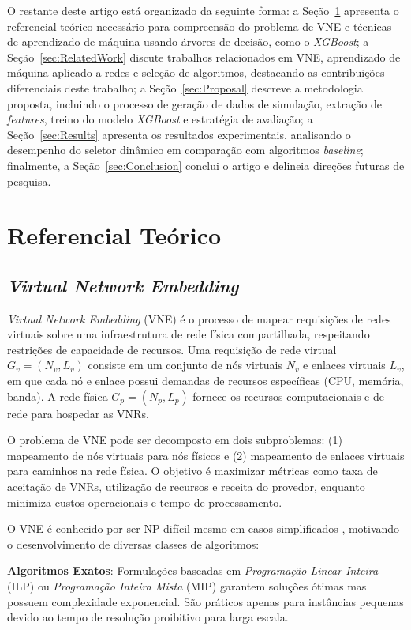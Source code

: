 \documentclass[conference]{IEEEtran}
\begin{document}
O restante deste artigo está organizado da seguinte forma: a Seção~\ref{sec:RefTeo} apresenta o referencial teórico necessário para compreensão do problema de VNE e técnicas de aprendizado de máquina usando árvores de decisão, como o \textit{XGBoost}; a Seção~\ref{sec:RelatedWork} discute trabalhos relacionados em VNE, aprendizado de máquina aplicado a redes e seleção de algoritmos, destacando as contribuições diferenciais deste trabalho; a Seção~\ref{sec:Proposal} descreve a metodologia proposta, incluindo o processo de geração de dados de simulação, extração de \textit{features}, treino do modelo \textit{XGBoost} e estratégia de avaliação; a Seção~\ref{sec:Results} apresenta os resultados experimentais, analisando o desempenho do seletor dinâmico em comparação com algoritmos \textit{baseline}; finalmente, a Seção~\ref{sec:Conclusion} conclui o artigo e delineia direções futuras de pesquisa.

\section{Referencial Teórico}
\label{sec:RefTeo}

\subsection{\textit{Virtual Network Embedding}}

\textit{Virtual Network Embedding} (VNE) é o processo de mapear requisições de redes virtuais sobre uma infraestrutura de rede física compartilhada, respeitando restrições de capacidade de recursos. Uma requisição de rede virtual $G_v = (N_v, L_v)$ consiste em um conjunto de nós virtuais $N_v$ e enlaces virtuais $L_v$, em que cada nó e enlace possui demandas de recursos específicas (CPU, memória, banda). A rede física $G_p = (N_p, L_p)$ fornece os recursos computacionais e de rede para hospedar as VNRs.

O problema de VNE pode ser decomposto em dois subproblemas: (1) mapeamento de nós virtuais para nós físicos e (2) mapeamento de enlaces virtuais para caminhos na rede física. O objetivo é maximizar métricas como taxa de aceitação de VNRs, utilização de recursos e receita do provedor, enquanto minimiza custos operacionais e tempo de processamento.

O VNE é conhecido por ser NP-difícil mesmo em casos simplificados \cite{vnboost}, motivando o desenvolvimento de diversas classes de algoritmos:

\textbf{Algoritmos Exatos}: Formulações baseadas em \textit{Programação Linear Inteira} (ILP) ou \textit{Programação Inteira Mista} (MIP) garantem soluções ótimas mas possuem complexidade exponencial. São práticos apenas para instâncias pequenas devido ao tempo de resolução proibitivo para larga escala.
\end{document}
